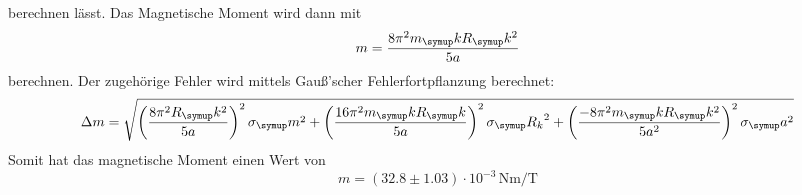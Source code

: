 berechnen lässt. Das Magnetische Moment wird dann mit
\begin{equation*}
  m = \frac{8\pi^2m_\su{k}R_\su{k}^2}{5a}
\end{equation*}
berechnen. Der zugehörige Fehler wird mittels Gauß'scher Fehlerfortpflanzung
berechnet:
\begin{equation*}
  \Delta m = \sqrt{\left(\frac{8\pi^2R_\su{k}^2}{5a}\right)^2\sigma_\su{m}^2 +
  \left(\frac{16\pi^2m_\su{k}R_\su{k}}{5a}\right)^2\sigma_\su{R_k}^2 +
  \left(\frac{-8\pi^2m_\su{k}R_\su{k}^2}{5a^2}\right)^2\sigma_\su{a}^2}
\end{equation*}
Somit hat das magnetische Moment einen Wert von
\begin{equation*}
  m = (32.8 \pm 1.03)\cdot10^{-3}\,\si{\newton\meter\per\tesla}
\end{equation*}
